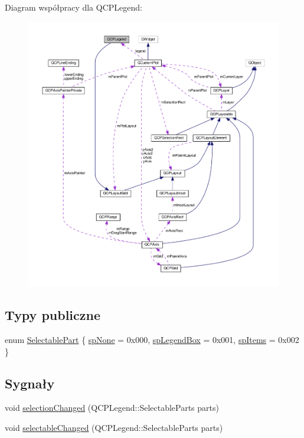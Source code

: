 Diagram współpracy dla Q\+C\+P\+Legend\+:\nopagebreak
\begin{figure}[H]
\begin{center}
\leavevmode
\includegraphics[width=350pt]{class_q_c_p_legend__coll__graph}
\end{center}
\end{figure}
\subsection*{Typy publiczne}
\begin{DoxyCompactItemize}
\item 
enum \hyperlink{class_q_c_p_legend_a5404de8bc1e4a994ca4ae69e2c7072f1}{Selectable\+Part} \{ \hyperlink{class_q_c_p_legend_a5404de8bc1e4a994ca4ae69e2c7072f1a378201c07d500af7126e3ec91652eed7}{sp\+None} = 0x000, 
\hyperlink{class_q_c_p_legend_a5404de8bc1e4a994ca4ae69e2c7072f1a0fa4758962a46fa1dc9da818abae23c4}{sp\+Legend\+Box} = 0x001, 
\hyperlink{class_q_c_p_legend_a5404de8bc1e4a994ca4ae69e2c7072f1a768bfb95f323db4c66473375032c0af7}{sp\+Items} = 0x002
 \}
\end{DoxyCompactItemize}
\subsection*{Sygnały}
\begin{DoxyCompactItemize}
\item 
void \hyperlink{class_q_c_p_legend_a82c88464edac07a9eefaf3906268df3b}{selection\+Changed} (Q\+C\+P\+Legend\+::\+Selectable\+Parts parts)
\item 
void \hyperlink{class_q_c_p_legend_a8a77300fd0976d6bdd8000f4e8d114b8}{selectable\+Changed} (Q\+C\+P\+Legend\+::\+Selectable\+Parts parts)
\end{DoxyCompactItemize}
